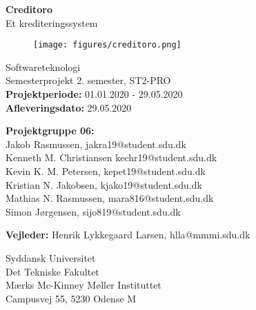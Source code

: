 \begin{titlepage}
\begin{center}
{ \LARGE \bfseries Creditoro \\[0.4cm]}
Et krediteringssystem
\begin{figure}[H]
\centering 
\texttt{[image: figures/creditoro.png]}
\label{figure:creditoro_system}
\end{figure}

Softwareteknologi\\
\vspace{2mm}
Semesterprojekt 2. semester, ST2-PRO\\
\vspace{2mm}
\textbf{Projektperiode:} 01.01.2020 - 29.05.2020 \\
\vspace{2mm}
\textbf{Afleveringsdato:} 29.05.2020 \\

\vspace{7mm}

\textbf{Projektgruppe 06:} \\
\vspace{2mm}
Jakob Rasmussen, jakra19@student.sdu.dk \\
\vspace{2mm}
Kenneth M. Christiansen kechr19@student.sdu.dk \\
\vspace{2mm}
Kevin K. M. Petersen, kepet19@student.sdu.dk \\
\vspace{2mm}
Kristian N. Jakobsen, kjako19@student.sdu.dk \\
\vspace{2mm}
Mathias N. Rasmussen, mara816@student.sdu.dk \\
\vspace{2mm}
Simon Jørgensen, sijo819@student.sdu.dk \\

\vspace{7mm}

\textbf{Vejleder:} Henrik Lykkegaard Larsen, hlla@mmmi.sdu.dk \\

\vfill

Syddansk Universitet\\
Det Tekniske Fakultet\\
Mærks Mc-Kinney Møller Instituttet\\
Campusvej 55, 5230 Odense M

\end{center}
\end{titlepage}